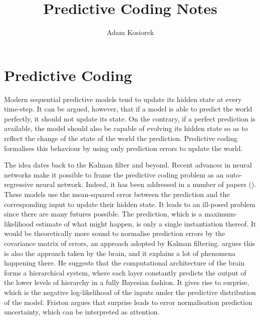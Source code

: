 \documentclass[]{article}
\title{Predictive Coding Notes}
\author{Adam Kosiorek}
\begin{document}
\maketitle

%

%	
%	
%	
\section{Predictive Coding}

	Modern sequential predictive models tend to update its hidden state at every time-step. It can be argued, however, that if a model is able to predict the world perfectly, it should not update its state. On the contrary, if a perfect prediction is available, the model should also be capable of evolving its hidden state so as to reflect the change of the state of the world \wrt the prediction. Predictive coding formalises this behaviour by using only prediction errors to update the world. 
	
	The idea dates back to the Kalman filter and beyond\addref. Recent advances in neural networks make it possible to frame the predictive coding problem as an auto-regressive neural network. Indeed, it has been addressed in a number of papers (\!\eg \cite{Lotter2016, Canziani2017}). These models use the mean-squared error between the prediction and the corresponding input to update their hidden state. It leads to an ill-posed problem since there are many futures possible. The prediction, which is a maximum-likelihood estimate of what might happen, is only a single instantiation thereof. It would be theoretically more sound to normalise prediction errors by the covariance matrix of errors, an approach adopted by Kalman filtering. \cite{Friston2009} argues this is also the approach taken by the brain, and it explains a lot of phenomena happening there. He suggests that the computational architecture of the brain forms a hierarchical system, where each layer constantly predicts the output of the lower levels of hierarchy in a fully Bayesian fashion. It gives rise to surprise, which is the negative log-likelihood of the inputs under the predictive distribution of the model. Friston argues that surprise leads to error normalisation \wrt prediction uncertainty, which can be interpreted as attention.
	
\end{document}
